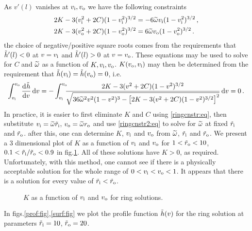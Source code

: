 As $v'(l)$ vanishes at $v_\mathrm{i},v_\mathrm{o}$ we have the following constraints
%
\begin{equation}\label{ringcnstr:eq}
\begin{split}
  2K - 3(v_\mathrm{i}^2+2C)(1-v_\mathrm{i}^2)^{3/2} &= -6\widetilde{\omega}v_\mathrm{i}(1-v_\mathrm{i}^2)^{3/2} \,, \\
  2K - 3(v_\mathrm{o}^2+2C)(1-v_\mathrm{o}^2)^{3/2} &= 6\widetilde{\omega}v_\mathrm{o}(1-v_\mathrm{o}^2)^{3/2} \,.
\end{split}
\end{equation}
%
the choice of negative/positive square roots comes from the
requirements that $\tilde h'(l)<0$ at $v=v_\mathrm{i}$ and $\tilde h'(l)>0$ at $v=v_\mathrm{o}$.
These equations may be used to solve for $C$ and $\widetilde{\omega}$ as a function
of $K, v_\mathrm{i}, v_\mathrm{o}$. $K(v_\mathrm{o},v_\mathrm{i})$ may then be determined from the
requirement that $\tilde h(v_\mathrm{i})=\tilde h(v_\mathrm{o})=0$, i.e.
%
\begin{equation}\label{ringcnstr2:eq}
  \int_{\vi}^{\vo} \diff{\g}{v} \, \dr v =
  -\int_{\vi}^{\vo}\!\!\!\frac{2K-3(v^2+2C)(1-v^2)^{3/2}}
    {\sqrt{36\tw^2v^2(1-v^2)^3-\brk{2K - 3(v^2+2C)(1-v^2)^{3/2}}^2}}
  \, \dr v
  = 0\,.
\end{equation}
%
In practice, it is easier to first eliminate $K$ and $C$ using
\eqref{ringcnstr:eq}, then substitute $v_\mathrm{i}=\widetilde{\omega}\tilde{r}_\mathrm{i}$, $v_\mathrm{o}=\widetilde{\omega}r_\mathrm{o}$ and
use \eqref{ringcnstr2:eq} to solve for $\widetilde{\omega}$ at fixed $\tilde{r}_\mathrm{i}$ and
$\tilde{r}_\mathrm{o}$. after this, one can determine $K$, $v_\mathrm{i}$ and $v_\mathrm{o}$ from
$\widetilde{\omega}$, $\tilde{r}_\mathrm{i}$ and $\tilde{r}_\mathrm{o}$. We present a 3 dimensional plot of $K$ as a
function of $v_\mathrm{i}$ and $v_\mathrm{o}$ for $1<\tilde{r}_\mathrm{o}<10$, $0.1<\tilde{r}_\mathrm{i}/\tilde{r}_\mathrm{o}<0.9$ in
fig.\ref{wplot:fig}. All of these solutions have $K>0$, as required.
Unfortunately, with this method, one cannot see if there is a
physically acceptable solution for the whole range of $0<v_\mathrm{i}<v_\mathrm{o}<1$.
It appears that there is a solution for every value of $\tilde{r}_\mathrm{i}<\tilde{r}_\mathrm{o}$.

\begin{figure}
%
\begin{center}
  
  \caption{$K$ as a function of $v_\mathrm{i}$ and $v_\mathrm{o}$ for ring solutions.}\label{wplot:fig}
\end{center}
%
\end{figure}



In figs.\ref{prof:fig},\ref{surf:fig} we plot the profile function $\tilde h(v)$ for the
ring solution at parameters
$\tilde{r}_\mathrm{i}=10$, $\tilde{r}_\mathrm{o}=20$.



